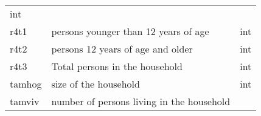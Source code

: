 \documentclass[11pt]{article}
\begin{document}
\begin{longtable}[]{@{}lll@{}}
\begin{minipage}[t]{0.24\columnwidth}
int\strut
\end{minipage}\tabularnewline
\begin{minipage}[t]{0.19\columnwidth}\raggedright\strut
r4t1\strut
\end{minipage} & \begin{minipage}[t]{0.16\columnwidth}\raggedright\strut
persons younger than 12 years of age\strut
\end{minipage} & \begin{minipage}[t]{0.24\columnwidth}\raggedright\strut
int\strut
\end{minipage}\tabularnewline
\begin{minipage}[t]{0.19\columnwidth}\raggedright\strut
r4t2\strut
\end{minipage} & \begin{minipage}[t]{0.16\columnwidth}\raggedright\strut
persons 12 years of age and older\strut
\end{minipage} & \begin{minipage}[t]{0.24\columnwidth}\raggedright\strut
int\strut
\end{minipage}\tabularnewline
\begin{minipage}[t]{0.19\columnwidth}\raggedright\strut
r4t3\strut
\end{minipage} & \begin{minipage}[t]{0.16\columnwidth}\raggedright\strut
Total persons in the household\strut
\end{minipage} & \begin{minipage}[t]{0.24\columnwidth}\raggedright\strut
int\strut
\end{minipage}\tabularnewline
\begin{minipage}[t]{0.19\columnwidth}\raggedright\strut
tamhog\strut
\end{minipage} & \begin{minipage}[t]{0.16\columnwidth}\raggedright\strut
size of the household\strut
\end{minipage} & \begin{minipage}[t]{0.24\columnwidth}\raggedright\strut
int\strut
\end{minipage}\tabularnewline
\begin{minipage}[t]{0.19\columnwidth}\raggedright\strut
tamviv\strut
\end{minipage} & \begin{minipage}[t]{0.16\columnwidth}\raggedright\strut
number of persons living in the household\strut
\end{minipage} & \begin{minipage}[t]{0.24\columnwidth}\raggedright\strut

\end{minipage}
\end{longtable}
\end{document}
